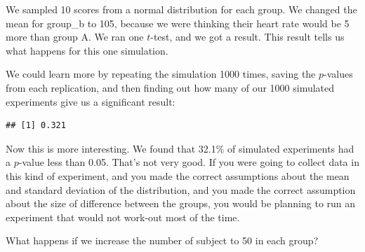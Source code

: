\documentclass[]{book}
\newenvironment{Shaded}{\begin{snugshade}}{\end{snugshade}}
\newcommand{\ControlFlowTok}[1]{\textcolor[rgb]{0.13,0.29,0.53}{\textbf{#1}}}
\newcommand{\DataTypeTok}[1]{\textcolor[rgb]{0.13,0.29,0.53}{#1}}
\newcommand{\DecValTok}[1]{\textcolor[rgb]{0.00,0.00,0.81}{#1}}
\newcommand{\FloatTok}[1]{\textcolor[rgb]{0.00,0.00,0.81}{#1}}
\newcommand{\KeywordTok}[1]{\textcolor[rgb]{0.13,0.29,0.53}{\textbf{#1}}}
\newcommand{\NormalTok}[1]{#1}
\newcommand{\OperatorTok}[1]{\textcolor[rgb]{0.81,0.36,0.00}{\textbf{#1}}}
\newcommand{\OtherTok}[1]{\textcolor[rgb]{0.56,0.35,0.01}{#1}}
\newcommand{\StringTok}[1]{\textcolor[rgb]{0.31,0.60,0.02}{#1}}
\begin{document}
We sampled 10 scores from a normal distribution for each group. We changed the mean for group\_b to 105, because we were thinking their heart rate would be 5 more than group A. We ran one \(t\)-test, and we got a result. This result tells us what happens for this one simulation.

We could learn more by repeating the simulation 1000 times, saving the \(p\)-values from each replication, and then finding out how many of our 1000 simulated experiments give us a significant result:

\begin{Shaded}
\end{Shaded}

\begin{verbatim}
## [1] 0.321
\end{verbatim}

Now this is more interesting. We found that 32.1\% of simulated experiments had a \(p\)-value less than 0.05. That's not very good. If you were going to collect data in this kind of experiment, and you made the correct assumptions about the mean and standard deviation of the distribution, and you made the correct assumption about the size of difference between the groups, you would be planning to run an experiment that would not work-out most of the time.

What happens if we increase the number of subject to 50 in each group?
\end{document}
